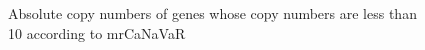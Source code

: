 \begin{figure}
    \centering
    \quad
    \caption{Absolute copy numbers of genes whose copy numbers are less than 10 according to mrCaNaVaR}
    \label{lessThan10}
\end{figure}


